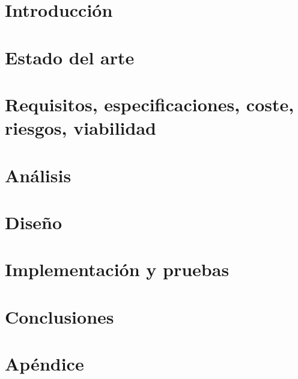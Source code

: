 \documentclass[twoside,spanish,a4paper,12pt]{tfg}
\begin{document}
	\tableofcontents
	
	\pagestyle{tfg}
	\justify
	
	
	
	\chapter{Introducción}
	
	
	\chapter{Estado del arte}
	
	
	\chapter{Requisitos, especificaciones, coste, riesgos, viabilidad}
	
	
	\chapter{Análisis}
	
	
	\chapter{Diseño}
	
	
	\chapter{Implementación y pruebas}
	
	
	\chapter{Conclusiones}
	
	
	
	
	\pagestyle{appendix}
	
	\appendix
	\chapter{Apéndice}
	
	
	
	
	
	
	
	
\end{document}
